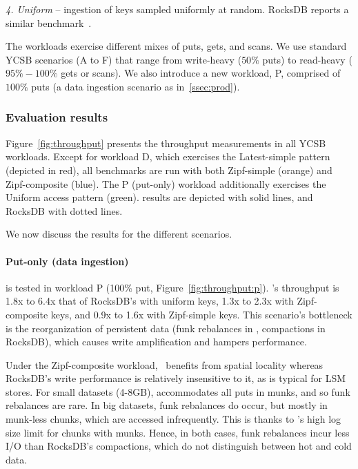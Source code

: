\emph{4. Uniform} -- ingestion of keys sampled uniformly at random. RocksDB
reports a similar benchmark~\cite{rocksdb-benchmarks}. %

The workloads exercise different mixes of puts, gets, and scans. We use standard YCSB scenarios 
(A to F) that range from write-heavy ($50\%$ puts) to read-heavy ($95\%-100\%$ gets or scans). 
We also introduce a new workload, P, comprised of $100\%$ puts (a data ingestion scenario
as in~\cref{ssec:prod}).

\subsubsection{Evaluation results}
Figure~\ref{fig:throughput} presents the throughput measurements in all YCSB workloads. 
Except for workload D, which exercises the Latest-simple pattern
(depicted in red), all benchmarks are run with both  Zipf-simple (orange) 
and Zipf-composite (blue). The P (put-only) workload 
additionally exercises the Uniform access pattern (green). \sys\/ results are depicted with solid
lines, and RocksDB with dotted lines. 

We now discuss the results for the different scenarios.
  
\paragraph{ Put-only (data ingestion)} is tested in workload
{P} (100\% put, Figure~\ref{fig:throughput:p}). 
\sys's throughput is 1.8x to 6.4x that of RocksDB's with uniform keys, 1.3x to 2.3x with Zipf-composite keys, 
and 0.9x to 1.6x with Zipf-simple keys. This scenario's bottleneck is the reorganization of persistent data  
(funk rebalances in \sys, compactions in RocksDB), which causes write amplification and hampers performance. 
 
 Under the Zipf-composite workload, \sys\ benefits from spatial locality whereas RocksDB's write performance 
 is relatively insensitive to it, as is typical for LSM stores. For small datasets (4-8GB), \sys\/ accommodates 
all puts in munks, and so funk rebalances are rare. In big datasets, funk rebalances do occur, but mostly in 
munk-less chunks, which are accessed infrequently. This is thanks to \sys\/'s high log size limit for chunks 
with munks. Hence, in both cases, funk rebalances incur less I/O than RocksDB's compactions, 
which do not distinguish between hot and cold data. 

